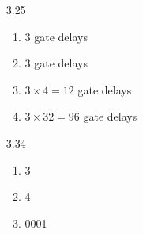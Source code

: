 \documentclass[a4paper]{article}
\begin{document}
\begin{enumerate}
\item[3.25]
\begin{enumerate}
\item 3 gate delays
\item 3 gate delays
\item $3\times 4 = 12$ gate delays
\item $3\times 32 = 96$ gate delays
\end{enumerate}
\item[3.34]
\begin{enumerate}
\item 3
\item 4
\item 0001
\end{enumerate}
\end{enumerate}
\end{document}
